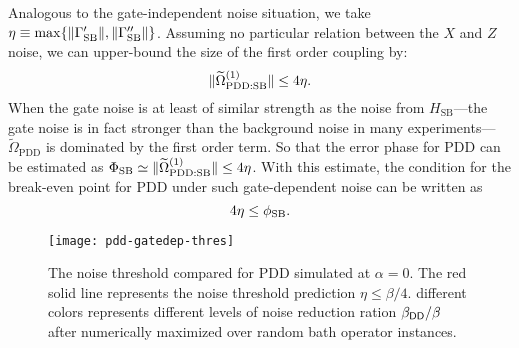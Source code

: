 \documentclass[pra,reprint,superscriptaddress]{revtex4-2}
\newcommand{\ep}{\Phi_\mathrm{SB}}
\begin{document}
Analogous to the gate-independent noise situation, we take $\eta\equiv \max\{\Vert \Gamma'_{\mathrm{SB}} \Vert,\Vert \Gamma''_{\mathrm{SB}}\Vert\}$. Assuming no particular relation between the $X$ and $Z$ noise,  we can upper-bound the size of the first order coupling by:
\begin{equation}\label{eq:gatedep-upperbound}
\Vert { \widetilde{\Omega}_\mathrm{PDD:SB}^{(1)} } \Vert \le 4 \eta.
\end{equation}
When the gate noise is at least of similar strength as the noise from $H_\mathrm{SB}$---the gate noise is in fact stronger than the background noise in many experiments---$\widetilde{\Omega}_\mathrm{PDD}$ is dominated by the first order term. So that the error phase for PDD can be estimated as $\ep\simeq \norm{ \widetilde{\Omega}_\mathrm{PDD:SB}^{(1)} } \leq 4\eta$.
With this estimate, the condition for the break-even point for PDD under such gate-dependent noise can be written as 
\begin{equation}
4\eta\leq\phi_{\mathrm{SB}}.
\end{equation}

 \begin{figure}
\texttt{[image: pdd-gatedep-thres]}
\caption{ The noise threshold compared for PDD  simulated at $\alpha=0$. The red solid line represents the noise threshold prediction $\eta\le\beta/4$. different colors represents different levels of noise reduction ration $\beta_{\mathsf{DD}}/\beta$ after numerically maximized over random bath operator instances.
\label{fig:cdd-gatedep-thres}}
\end{figure}

\end{document}
